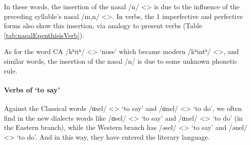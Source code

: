 In these words, the insertion of the nasal /n/ <> is due to the influence of the preceding syllable's nasal /m,n/ <>. In verbs, the 1{\pl} imperfective and perfective forms also show this insertion, via analogy to present verbs (Table \ref{tab:nasalEpenthisisVerb}). 


\begin{table}[H]
	\centering
	\caption{Diachronic nasal epenthesis in the past 1PL suffix with the example verb `to eat'}
	\label{tab:nasalEpenthisisVerb}
	\end{table} 



As for the word CA /kʰitʰ/ <> `nose' which became modern /kʰintʰ/ <>, and similar words, the insertion of the nasal /n/ is due to some unknown phonetic rule. 

\paragraph{Verbs of `to say'}


Against the Classical words /ɑsel/ <> `to say' and /ɑnel/ <> `to do', we often find in the new dialects words like /ɑsel/ <> `to say' and /ɑnel/ <> `to do' (in the Eastern branch), while the Western branch has /əsel/ <> `to say' and /ənel/ <> `to do'. And in this way, they have entered the literary language. 

